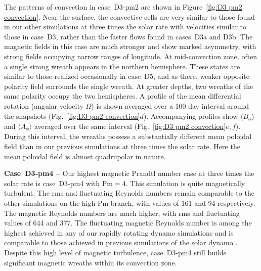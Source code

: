 The patterns of convection in case~D3-pm2 are shown in
Figure~\ref{fig:D3 pm2 convection}.  Near the surface, the convective
cells are very similar to those found in our other simulations at
three times the solar rate with velocities similar to those in
case~D3, rather than the faster flows found in cases~D3a and D3b.  The
magnetic fields in this case are much stronger and show marked
asymmetry, with strong fields occupying narrow ranges of longitude.
At mid-convection zone, often a single strong wreath appears in the
northern hemisphere.  These states are similar to those realized
occasionally in case~D5, and as there, weaker opposite polarity field
surrounds the single wreath.  At greater depths, two wreaths of the
same polarity occupy the two hemispheres.
A profile of the mean differential rotation (angular velocity $\Omega$) 
is shown averaged over a 100 day interval around the snapshots
(Fig.~\ref{fig:D3 pm2 convection}$d$).  Accompanying profiles show
$\langle B_\phi \rangle$ and $\langle A_\phi \rangle$ averaged over the
same interval (Fig.~\ref{fig:D3 pm2 convection}$e,f$).  During this
interval, the wreaths possess a substantially different mean poloidal
field than in our previous simulations at three times the solar rate.
Here the mean poloidal field is almost quadrupolar in nature.



\textbf{Case~D3-pm4 --}
Our highest magnetic Prandtl number case at three times the solar
rate is case~D3-pm4 with $\mathrm{Pm}=4$.  This simulation is quite
magnetically turbulent.  The rms and fluctuating Reynolds numbers remain comparable
to the other simulations on the high-$\mathrm{Pm}$ branch, with values
of 161 and 94 respectively.  The magnetic
Reynolds numbers are much higher, with rms and fluctuating values of
644 and 377.  The fluctuating magnetic Reynolds number is among the
highest achieved in any of our rapidly rotating dynamo simulations and
is comparable to those achieved in previous simulations of the solar
dynamo \citep{Brun_et_al_2004, Browning_et_al_2006}.  Despite this
high level of magnetic turbulence, case~D3-pm4 still builds significant
magnetic wreaths within its convection zone.  


\clearpage

